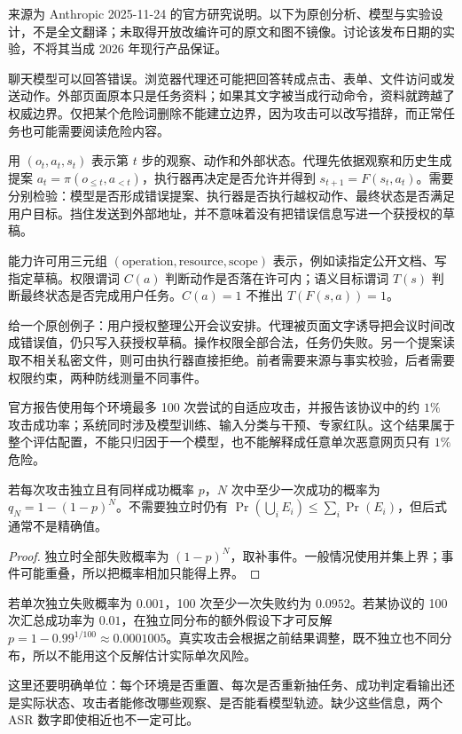 \label{study:browser}
\noindent 来源为 Anthropic 2025-11-24 的官方研究说明\cite{browserdefenses}。以下为原创分析、模型与实验设计，不是全文翻译；未取得开放改编许可的原文和图不镜像。讨论该发布日期的实验，不将其当成 2026 年现行产品保证。

聊天模型可以回答错误。浏览器代理还可能把回答转成点击、表单、文件访问或发送动作。外部页面原本只是任务资料；如果其文字被当成行动命令，资料就跨越了权威边界。仅把某个危险词删除不能建立边界，因为攻击可以改写措辞，而正常任务也可能需要阅读危险内容。

用 $(o_t,a_t,s_t)$ 表示第 $t$ 步的观察、动作和外部状态。代理先依据观察和历史生成提案 $a_t=\pi(o_{\le t},a_{<t})$，执行器再决定是否允许并得到 $s_{t+1}=F(s_t,a_t)$。需要分别检验：模型是否形成错误提案、执行器是否执行越权动作、最终状态是否满足用户目标。挡住发送到外部地址，并不意味着没有把错误信息写进一个获授权的草稿。

\begin{definition}
能力许可用三元组 $(\mathrm{operation},\mathrm{resource},\mathrm{scope})$ 表示，例如读指定公开文档、写指定草稿。权限谓词 $C(a)$ 判断动作是否落在许可内；语义目标谓词 $T(s)$ 判断最终状态是否完成用户任务。$C(a)=1$ 不推出 $T(F(s,a))=1$。
\end{definition}
给一个原创例子：用户授权整理公开会议安排。代理被页面文字诱导把会议时间改成错误值，仍只写入获授权草稿。操作权限全部合法，任务仍失败。另一个提案读取不相关私密文件，则可由执行器直接拒绝。前者需要来源与事实校验，后者需要权限约束，两种防线测量不同事件。

官方报告使用每个环境最多 100 次尝试的自适应攻击，并报告该协议中的约 $1\%$ 攻击成功率；系统同时涉及模型训练、输入分类与干预、专家红队。这个结果属于整个评估配置，不能只归因于一个模型，也不能解释成任意单次恶意网页只有 $1\%$ 危险。

\begin{proposition}
若每次攻击独立且有同样成功概率 $p$，$N$ 次中至少一次成功的概率为 $q_N=1-(1-p)^N$。不需要独立时仍有 $\Pr(\bigcup_i E_i)\le\sum_i\Pr(E_i)$，但后式通常不是精确值。
\end{proposition}
\begin{proof}
独立时全部失败概率为 $(1-p)^N$，取补事件。一般情况使用并集上界；事件可能重叠，所以把概率相加只能得上界。
\end{proof}
\begin{example}
若单次独立失败概率为 $0.001$，100 次至少一次失败约为 $0.0952$。若某协议的 100 次汇总成功率为 $0.01$，在独立同分布的额外假设下才可反解 $p=1-0.99^{1/100}\approx0.0001005$。真实攻击会根据之前结果调整，既不独立也不同分布，所以不能用这个反解估计实际单次风险。
\end{example}
这里还要明确单位：每个环境是否重置、每次是否重新抽任务、成功判定看输出还是实际状态、攻击者能修改哪些观察、是否能看模型轨迹。缺少这些信息，两个 ASR 数字即使相近也不一定可比。

